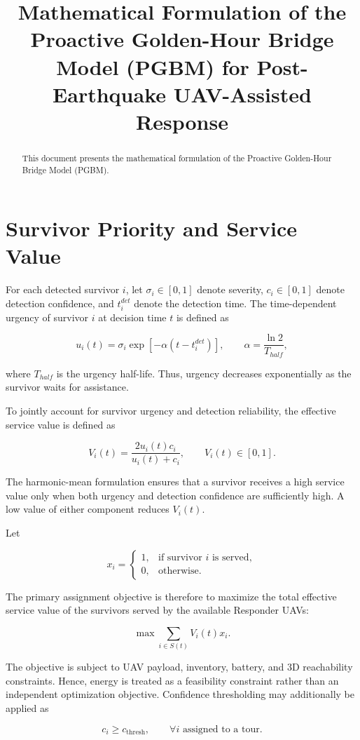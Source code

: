 \documentclass[conference]{IEEEtran}
\title{Mathematical Formulation of the Proactive Golden-Hour Bridge Model (PGBM) for Post-Earthquake UAV-Assisted Response}
\author{\IEEEauthorblockN{Author Name}
\IEEEauthorblockA{\textit{Department of Computer Science and Engineering}\\
\textit{University Name}\\
Email: author@email.com}
}
\begin{document}
\maketitle

\begin{abstract}
This document presents the mathematical formulation of the Proactive Golden-Hour Bridge Model (PGBM).
\end{abstract}

\section{Survivor Priority and Service Value}

For each detected survivor $i$, let $\sigma_i \in [0,1]$ denote
severity, $c_i \in [0,1]$ denote detection confidence, and
$t_i^{det}$ denote the detection time. The time-dependent urgency
of survivor $i$ at decision time $t$ is defined as

\begin{equation}
u_i(t)
=
\sigma_i
\exp\left[-\alpha\left(t-t_i^{det}\right)\right],
\qquad
\alpha=\frac{\ln 2}{T_{half}},
\end{equation}

where $T_{half}$ is the urgency half-life. Thus, urgency decreases
exponentially as the survivor waits for assistance.

To jointly account for survivor urgency and detection reliability,
the effective service value is defined as

\begin{equation}
V_i(t)
=
\frac{2u_i(t)c_i}{u_i(t)+c_i},
\qquad
V_i(t)\in[0,1].
\end{equation}

The harmonic-mean formulation ensures that a survivor receives a
high service value only when both urgency and detection confidence
are sufficiently high. A low value of either component reduces
$V_i(t)$.

Let

\begin{equation}
x_i =
\begin{cases}
1, & \text{if survivor } i \text{ is served},\\
0, & \text{otherwise}.
\end{cases}
\end{equation}

The primary assignment objective is therefore to maximize the total
effective service value of the survivors served by the available
Responder UAVs:

\begin{equation}
\max
\sum_{i\in S(t)} V_i(t)x_i.
\end{equation}

The objective is subject to UAV payload, inventory, battery, and
3D reachability constraints. Hence, energy is treated as a
feasibility constraint rather than an independent optimization
objective. Confidence thresholding may additionally be applied as

\begin{equation}
c_i \geq c_{\mathrm{thresh}},
\qquad \forall i \text{ assigned to a tour}.
\end{equation}
\end{document}
